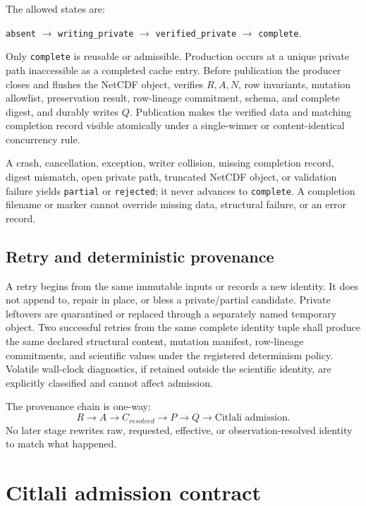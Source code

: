 \documentclass[11pt]{article}
\newcommand{\code}[1]{\texttt{#1}}
\begin{document}
The allowed states are:
\begin{center}
\code{absent} $\longrightarrow$ \code{writing\_private}
$\longrightarrow$ \code{verified\_private} $\longrightarrow$
\code{complete}.
\end{center}
Only \code{complete} is reusable or admissible.  Production occurs at a unique
private path inaccessible as a completed cache entry.  Before publication the
producer closes and flushes the NetCDF object, verifies $R,A,N$, row
invariants, mutation allowlist, preservation result, row-lineage commitment,
schema, and complete digest, and durably writes $Q$.  Publication makes the
verified data and matching completion record visible atomically under a
single-winner or content-identical concurrency rule.

A crash, cancellation, exception, writer collision, missing completion record,
digest mismatch, open private path, truncated NetCDF object, or validation
failure yields \code{partial} or \code{rejected}; it never advances to
\code{complete}.  A completion filename or marker cannot override missing
data, structural failure, or an error record.

\subsection{Retry and deterministic provenance}

A retry begins from the same immutable inputs or records a new identity.  It
does not append to, repair in place, or bless a private/partial candidate.
Private leftovers are quarantined or replaced through a separately named
temporary object.  Two successful retries from the same complete identity
tuple shall produce the same declared structural content, mutation manifest,
row-lineage commitments, and scientific values under the registered
determinism policy.  Volatile wall-clock diagnostics, if retained outside the
scientific identity, are explicitly classified and cannot affect admission.

The provenance chain is one-way:
\[
R\rightarrow A\rightarrow C_{resolved}\rightarrow P\rightarrow Q
\rightarrow\text{Citlali admission}.
\]
No later stage rewrites raw, requested, effective, or observation-resolved
identity to match what happened.

\section{Citlali admission contract}
\end{document}
